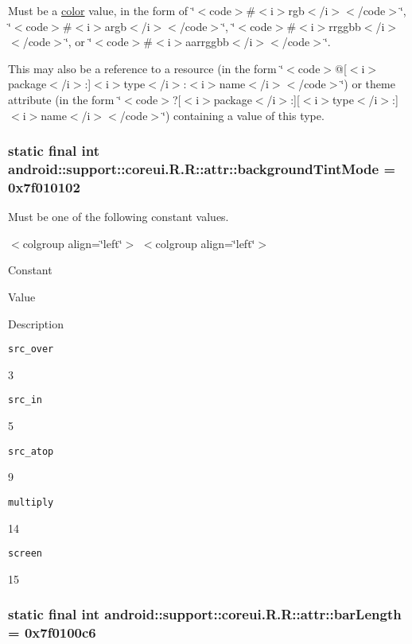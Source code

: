 Must be a \hyperlink{classandroid_1_1support_1_1coreui_1_1_r_1_1color}{color} value, in the form of \char`\"{}$<$code$>$\#$<$i$>$rgb$<$/i$>$$<$/code$>$\char`\"{}, \char`\"{}$<$code$>$\#$<$i$>$argb$<$/i$>$$<$/code$>$\char`\"{}, \char`\"{}$<$code$>$\#$<$i$>$rrggbb$<$/i$>$$<$/code$>$\char`\"{}, or \char`\"{}$<$code$>$\#$<$i$>$aarrggbb$<$/i$>$$<$/code$>$\char`\"{}. 

This may also be a reference to a resource (in the form \char`\"{}$<$code$>$@\mbox{[}$<$i$>$package$<$/i$>$:\mbox{]}$<$i$>$type$<$/i$>$:$<$i$>$name$<$/i$>$$<$/code$>$\char`\"{}) or theme attribute (in the form \char`\"{}$<$code$>$?\mbox{[}$<$i$>$package$<$/i$>$:\mbox{]}\mbox{[}$<$i$>$type$<$/i$>$:\mbox{]}$<$i$>$name$<$/i$>$$<$/code$>$\char`\"{}) containing a value of this type. \hypertarget{classandroid_1_1support_1_1coreui_1_1_r_1_1attr_98263a93a692007d96b19c826dbbfd85}{
\subsubsection[{backgroundTintMode}]{\setlength{\rightskip}{0pt plus 5cm}static final int android::support::coreui.R.R::attr::backgroundTintMode = 0x7f010102}}
\label{classandroid_1_1support_1_1coreui_1_1_r_1_1attr_98263a93a692007d96b19c826dbbfd85}


Must be one of the following constant values. \begin{TabularC}{0}
\hline
\end{TabularC}
$<$colgroup align=\char`\"{}left\char`\"{}$>$ $<$colgroup align=\char`\"{}left\char`\"{}$>$ 

Constant

Value

Description 

{\tt src\_\-over}

3

{\tt src\_\-in}

5

{\tt src\_\-atop}

9

{\tt multiply}

14

{\tt screen}

15\hypertarget{classandroid_1_1support_1_1coreui_1_1_r_1_1attr_6c2f4057ab41d143eb33004e234803ae}{
\subsubsection[{barLength}]{\setlength{\rightskip}{0pt plus 5cm}static final int android::support::coreui.R.R::attr::barLength = 0x7f0100c6}}
\label{classandroid_1_1support_1_1coreui_1_1_r_1_1attr_6c2f4057ab41d143eb33004e234803ae}


